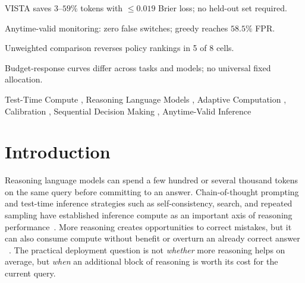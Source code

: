 \documentclass[a4paper,fleqn]{cas-sc}
\theoremstyle{plain}
\theoremstyle{definition}
\theoremstyle{remark}
\begin{document}
\begin{highlights}
\item VISTA saves $3$--$59\%$ tokens with $\leq\!0.019$ Brier loss; no held-out set required.

\item Anytime-valid monitoring: zero false switches; greedy reaches $58.5\%$ FPR.

\item Unweighted comparison reverses policy rankings in 5 of 8 cells.

\item Budget-response curves differ across tasks and models; no universal fixed allocation.
\end{highlights}

\begin{keywords}
Test-Time Compute \sep
Reasoning Language Models \sep
Adaptive Computation \sep
Calibration \sep
Sequential Decision Making \sep
Anytime-Valid Inference
\end{keywords}

\maketitle

\section{Introduction}
\label{sec:introduction}

Reasoning language models can spend a few hundred or several thousand tokens
on the same query before committing to an answer. Chain-of-thought prompting and
test-time inference strategies such as self-consistency, search, and repeated
sampling have established inference compute as an important axis of reasoning
performance~\cite{wei2022cot,kojima2022zeroshot,wang2023selfconsistency,yao2023tree,brown2024monkeys,snell2025scaling}.
More reasoning creates opportunities to correct mistakes, but it can also
consume compute without benefit or overturn an already correct answer
~\cite{chen2025overthinking,zhou2026overthinking}.
The practical deployment question is not \emph{whether} more reasoning helps
on average, but \emph{when} an additional block of reasoning is worth its cost
for the current query.
\end{document}
